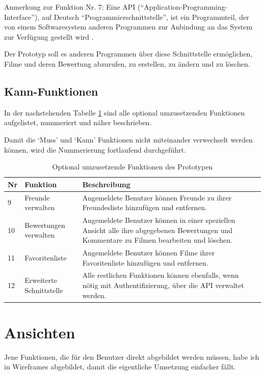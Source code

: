 Anmerkung zur Funktion Nr. 7: Eine API (``Application-Programming-Interface''), auf 
Deutsch ``Programmierschnittstelle'', ist ein Programmteil, der von einem Softwaresystem 
anderen Programmen zur Anbindung an das System zur Verfügung gestellt wird \cite{api}.

Der Prototyp soll es anderen Programmen über diese Schnittstelle ermöglichen,
Filme und deren Bewertung abzurufen, zu erstellen, zu ändern und zu löschen.

\subsection{Kann-Funktionen}
In der nachstehenden Tabelle \ref{tab:kann_funktionen} sind alle optional 
umzusetzenden Funktionen aufgelistet, nummeriert und näher beschrieben.

Damit die `Muss' und `Kann' Funktionen nicht miteinander verwechselt werden 
können, wird die Nummerierung fortlaufend durchgeführt.

\begin{table}[h]
\begin{center}
    \begin{tabular}{llp{8cm}l}
        \toprule Nr & Funktion & Beschreibung \\
        \midrule 9 & Freunde verwalten & Angemeldete Benutzer können Freunde
                     zu ihrer Freundesliste hinzufügen und entfernen. \\
        \midrule 10 & Bewertungen verwalten & Angemeldete Benutzer können
                     in einer speziellen Ansicht alle ihre abgegebenen Bewertungen
                     und Kommentare zu Filmen bearbeiten und löschen. \\
        \midrule 11 & Favoritenliste & Angemeldete Benutzer können Filme ihrer
                     Favoritenliste hinzufügen und entfernen. \\
        \midrule 12 & Erweiterte Schnittstelle & Alle restlichen Funktionen
                     können ebenfalls, wenn nötig mit Authentifizierung, über
                     die API verwaltet werden. \\
        \bottomrule
    \end{tabular}
    \caption{Optional umzusetzende Funktionen des Prototypen}
    \label{tab:kann_funktionen}
\end{center}
\end{table}

\section{Ansichten}
Jene Funktionen, die für den Benutzer direkt abgebildet werden müssen, habe
ich in Wireframes \cite{wireframe} abgebildet, damit die eigentliche Umsetzung 
einfacher fällt.

